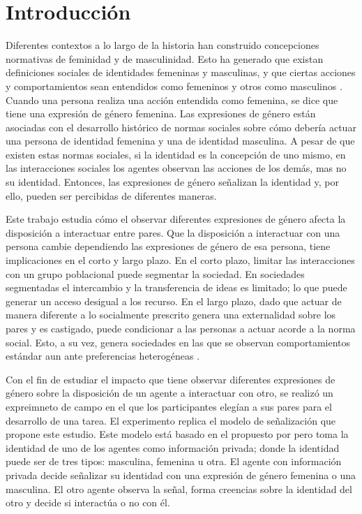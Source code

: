 \section{Introducción}
Diferentes contextos a lo largo de la historia han construido concepciones normativas de feminidad y de masculinidad. Esto ha generado que existan definiciones sociales de identidades femeninas y masculinas, y que ciertas acciones y comportamientos sean entendidos como femeninos y otros como  masculinos \citep{scott2007gender}. Cuando una persona realiza una acción entendida como femenina, se dice que tiene una expresión de género femenina. Las expresiones de género están asociadas con el desarrollo histórico de normas sociales sobre cómo debería actuar una persona de identidad femenina y una de identidad masculina. A pesar de que existen estas normas sociales, si la identidad es la concepción de uno mismo, en las interacciones sociales los agentes observan las acciones de los demás, mas no su identidad. Entonces, las expresiones de género señalizan la identidad y, por ello, pueden ser percibidas de diferentes maneras.

Este trabajo estudia cómo el observar diferentes expresiones de género afecta la disposición a interactuar entre pares. Que la disposición a interactuar con una persona cambie dependiendo las expresiones de género de esa persona, tiene implicaciones en el corto y largo plazo. En el corto plazo, limitar las interacciones con un grupo poblacional puede segmentar la sociedad. En sociedades segmentadas el intercambio y la transferencia de ideas es limitado; lo que puede generar un acceso desigual a los recurso. En el largo plazo, dado que actuar de manera diferente a lo socialmente prescrito genera una externalidad sobre los pares y es castigado, puede condicionar a las personas a actuar acorde a la norma social. Esto, a su vez, genera sociedades en las que se observan comportamientos estándar aun ante preferencias heterogéneas \citep{bernheim1994theory,akerlof2000economics}.

Con el fin de estudiar el impacto que tiene observar diferentes expresiones de género sobre la disposición de un agente a interactuar con otro, se realizó un expreimneto de campo en el que los participantes elegían a sus pares para el desarrollo de una tarea. El experimento replica el modelo de señalización que propone este estudio. Este modelo está basado en el propuesto por \cite{akerlof2000economics} pero toma la identidad de uno de los agentes como información privada; donde la identidad puede ser de tres tipos: masculina, femenina u otra. El agente con información privada decide señalizar su identidad con una expresión de género femenina o una masculina. El otro agente observa la señal, forma creencias sobre la identidad del otro y decide si interactúa o no con él. 

